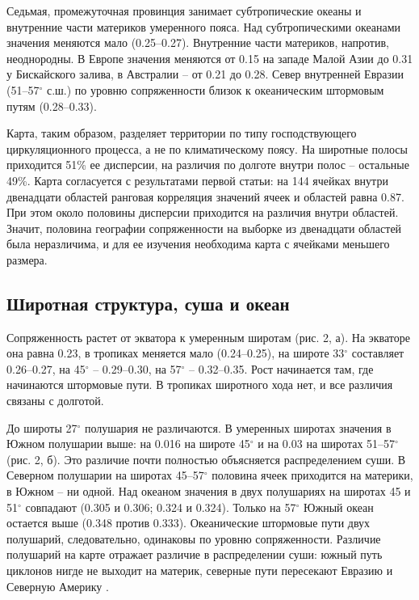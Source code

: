 \documentclass[12pt,a4paper]{article}
\begin{document}
Седьмая, промежуточная провинция занимает субтропические океаны и внутренние части материков умеренного пояса. Над субтропическими океанами значения меняются мало (0.25--0.27). Внутренние части материков, напротив, неоднородны. В Европе значения меняются от 0.15 на западе Малой Азии до 0.31 у Бискайского залива, в Австралии -- от 0.21 до 0.28. Север внутренней Евразии (51--57$^\circ$ с.ш.) по уровню сопряженности близок к океаническим штормовым путям (0.28--0.33).

Карта, таким образом, разделяет территории по типу господствующего циркуляционного процесса, а не по климатическому поясу. На широтные полосы приходится 51\% ее дисперсии, на различия по долготе внутри полос -- остальные 49\%. Карта согласуется с результатами первой статьи: на 144 ячейках внутри двенадцати областей ранговая корреляция значений ячеек и областей равна 0.87. При этом около половины дисперсии приходится на различия внутри областей. Значит, половина географии сопряженности на выборке из двенадцати областей была неразличима, и для ее изучения необходима карта с ячейками меньшего размера.

\subsection{Широтная структура, суша и океан}

Сопряженность растет от экватора к умеренным широтам (рис. 2, а). На экваторе она равна 0.23, в тропиках меняется мало (0.24--0.25), на широте 33$^\circ$ составляет 0.26--0.27, на 45$^\circ$ -- 0.29--0.30, на 57$^\circ$ -- 0.32--0.35. Рост начинается там, где начинаются штормовые пути. В тропиках широтного хода нет, и все различия связаны с долготой.

До широты 27$^\circ$ полушария не различаются. В умеренных широтах значения в Южном полушарии выше: на 0.016 на широте 45$^\circ$ и на 0.03 на широтах 51--57$^\circ$ (рис. 2, б). Это различие почти полностью объясняется распределением суши. В Северном полушарии на широтах 45--57$^\circ$ половина ячеек приходится на материки, в Южном -- ни одной. Над океаном значения в двух полушариях на широтах 45 и 51$^\circ$ совпадают (0.305 и 0.306; 0.324 и 0.324). Только на 57$^\circ$ Южный океан остается выше (0.348 против 0.333). Океанические штормовые пути двух полушарий, следовательно, одинаковы по уровню сопряженности. Различие полушарий на карте отражает различие в распределении суши: южный путь циклонов нигде не выходит на материк, северные пути пересекают Евразию и Северную Америку \cite{Trenberth1991,HoskinsHodges2005}.
\end{document}
